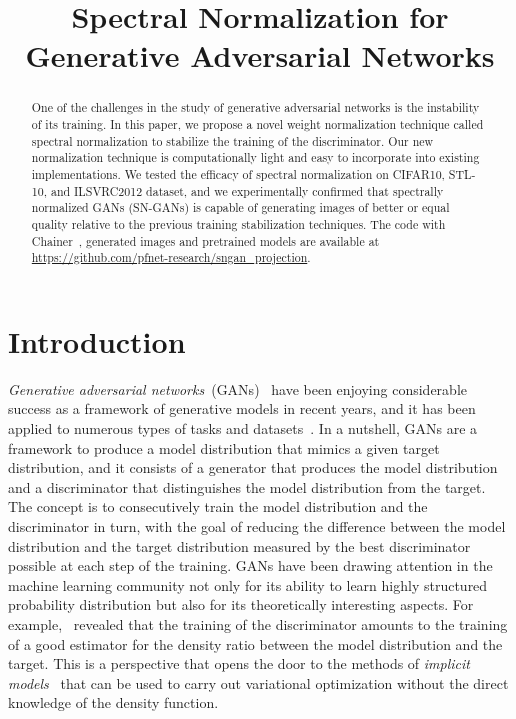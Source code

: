 \title{Spectral Normalization for Generative Adversarial Networks}

\begin{abstract}
One of the challenges in the study of generative adversarial networks is the instability of its training. In this paper, we propose a novel weight normalization technique called spectral normalization to stabilize the training of the discriminator. Our new normalization technique is computationally light and easy to incorporate into existing implementations. We tested the efficacy of spectral normalization on CIFAR10, STL-10, and ILSVRC2012 dataset, and we experimentally confirmed that spectrally normalized GANs (SN-GANs) is capable of generating images of better or equal quality relative to the previous training stabilization techniques. The code with Chainer~\cite[]{tokui2015chainer}, generated images and pretrained models are available at \url{https://github.com/pfnet-research/sngan_projection}.
\end{abstract}

\section{Introduction}
\textit{Generative adversarial networks}~(GANs)~\cite[]{goodfellow2014generative} have been enjoying considerable success as a framework of generative models in recent years, and it has been applied to numerous types of tasks and datasets~\cite[]{radford2015unsupervised, salimans2016improved, ho2016generative, li2017adversarial}. In a nutshell, GANs are a framework to produce a model distribution that mimics a given target distribution, and it consists of a generator that produces the model distribution and a discriminator that distinguishes the model distribution from the target. The concept is to consecutively train the model distribution and the discriminator in turn, with the goal of reducing the difference between the model distribution and the target distribution measured by the best discriminator possible at each step of the training. GANs have been drawing attention in the machine learning community not only for its ability to learn highly structured probability distribution but also for its theoretically interesting aspects. For example,~\cite[]{nowozin2016f, uehara2016generative, mohamed2016learning} revealed that the training of the discriminator amounts to the training of a good estimator for the density ratio between the model distribution and the target. This is a perspective that opens the door to the methods of
\textit{implicit models}~\cite[]{mohamed2016learning, tran2017deep} that can be used to carry out variational optimization without the direct knowledge of the density function.

